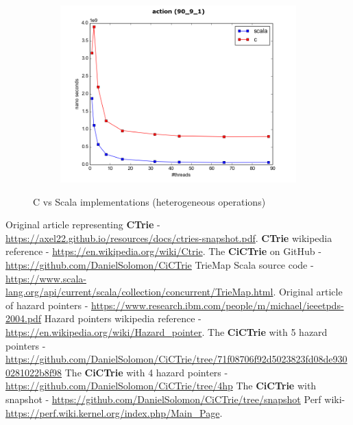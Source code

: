 \documentclass[conference]{IEEEtran}
\begin{document}
\begin{figure}
\begin{subfigure}{.5\textwidth}
			\includegraphics[width=0.45\paperwidth]{vs_scala/action_90_9_1.png}
			\label{fig:c_vs_scala_90_9_1}
		\end{subfigure}
		\caption{C vs Scala implementations (heterogeneous operations)}
		\label{fig:heterogeneous_operations}
	\end{figure}	


\begin{thebibliography}{1}
	 Original article representing \textbf{CTrie} - \url{https://axel22.github.io/resources/docs/ctries-snapshot.pdf}. 
	 \textbf{CTrie} wikipedia reference - \url{https://en.wikipedia.org/wiki/Ctrie}.
	 The \textbf{CiCTrie} on GitHub -
	\url{https://github.com/DanielSolomon/CiCTrie}
	 TrieMap Scala source code - \url{https://www.scala-lang.org/api/current/scala/collection/concurrent/TrieMap.html}.
	 Original article of hazard pointers - 
	\url{https://www.research.ibm.com/people/m/michael/ieeetpds-2004.pdf}
	 Hazard pointers wikipedia reference - \url{https://en.wikipedia.org/wiki/Hazard_pointer}.
	 The \textbf{CiCTrie} with 5 hazard pointers -
	\url{https://github.com/DanielSolomon/CiCTrie/tree/71f08706f92d5023823fd08de9300281022b8f98}
	 The \textbf{CiCTrie} with 4 hazard pointers -
	\url{https://github.com/DanielSolomon/CiCTrie/tree/4hp}
	 The \textbf{CiCTrie} with snapshot -
	\url{https://github.com/DanielSolomon/CiCTrie/tree/snapshot}
	 Perf wiki-  \url{https://perf.wiki.kernel.org/index.php/Main_Page}.
	
\end{thebibliography}

\end{document}
